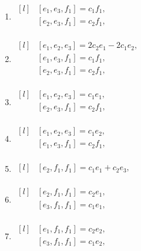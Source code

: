 \begin{adjustwidth*}{-0.5cm}{0cm}
\begin{multicols*}{2}
\begin{enumerate}
    \item $\begin{matrix*}[l]
            & [e_1, e_3, f_1] = c_{1} f_1, \\
            & [e_2, e_3, f_1] = c_{2} f_1, \\
        \end{matrix*}$

    \item $\begin{matrix*}[l]
            & [e_1, e_2, e_3] = 2 c_{2} e_1 - 2 c_{1} e_2 , \\
            & [e_1, e_3, f_1] = c_{1} f_1, \\
            & [e_2, e_3, f_1] = c_{2} f_1, \\
        \end{matrix*}$

    \item $\begin{matrix*}[l]
            & [e_1, e_2, e_3] = c_{1} e_1  , \\
            & [e_2, e_3, f_1] = c_{2} f_1, \\
        \end{matrix*}$

    \item $\begin{matrix*}[l]
            & [e_1, e_2, e_3] =  c_{1} e_2 , \\
            & [e_1, e_3, f_1] = c_{2} f_1, \\
        \end{matrix*}$

    \item $\begin{matrix*}[l]
            & [e_2, f_1, f_1] = c_{1} e_1  + c_{2} e_3, \\
        \end{matrix*}$

    \item $\begin{matrix*}[l]
            & [e_2, f_1, f_1] = c_{2} e_1  , \\
            & [e_3, f_1, f_1] = c_{1} e_1  , \\
        \end{matrix*}$

    \item $\begin{matrix*}[l]
            & [e_1, f_1, f_1] =  c_{2} e_2 , \\
            & [e_3, f_1, f_1] =  c_{1} e_2 , \\
        \end{matrix*}$


\end{enumerate}
\end{multicols*}
\end{adjustwidth*}
